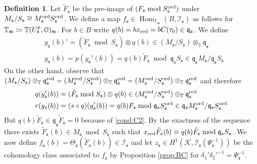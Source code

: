 \documentclass[leqno]{amsart}
\theoremstyle{definition}
\newtheorem{defn}[thm]{Definition}
\theoremstyle{remark}
\newcommand{\eo}{\EuScript{O}}
\DeclareMathOperator{\Hom}{Hom}
\newcommand{\fm}{\mathfrak{m}}
\newcommand{\fq}{\mathfrak{q}}
\newcommand{\fs}{\mathfrak{s}}
\newcommand{\red}{\textnormal{red}}
\newcommand{\xx}{x_\textnormal{red}}
\newcommand{\K}{{\mathcal{K}}} %
\newcommand{\TT}{\mathbb{T}} %
\newcommand{\I}{\mathcal{I}} %
\newcommand{\ord}{\textnormal{ord}} %
\begin{document}
\begin{defn}\label{def:cong_map}
Let $\tilde{F}_\fs$ be the pre-image of
$(F_\fs\bmod S_\fs^{\ord})$ under 
$M_\fs/S_\fs\cong M^{\ord}_{\fs}S^{\ord}_{\fs}$.
We define a map  $f_\fs\in \Hom_{\TT_\fm}(B,\I_\fs)$ 
as follows for $\TT_\fm\coloneqq \TT(U^p_\fs,\eo)_\fm$.
For $b\in B$ write $q(b)=b\xx=bC(\tau_0)\in\fq_\fs$.
We define
\begin{align*}
   &y_\fs(b)'=
(\tilde{F}_\fs\bmod S_\fs)\otimes q(b)\in 
(M_\fs/S_\fs)\otimes_\TT\fq_\fs\\
   &y_\fs(b)=p(y_\fs'(b))=
q(b)\tilde{F}_\fs\bmod \fq_\fs S_\fs\in 
\fq_\fs M_\fs/\fq_\fs S_\fs
\end{align*}
On the other hand, observe that 
$(M_\fs/S_\fs)\otimes_{\TT}\fq_\fs^\red=
(M_\fs^{\red}/S_\fs^{\red})\otimes_{\TT}\fq_\fs^\red=
(M_\fs^{\ord}/S_\fs^{\ord})\otimes_{\TT}\fq_\fs^\red$
and therefore
\begin{align*}
   q(y_\fs'(b))&=
(\tilde{F}_\fs\bmod S_\fs)\otimes q(b)\in 
(M^{\ord}_\fs/S^{\ord}_\fs)\otimes_\TT\fq_\fs^\red\\
   r(y_\fs(b))&=(s\circ q)(y_\fs'(b))=
q(b)F_\fs\bmod \fq_\fs S^{\ord}_\fs\in 
\fq_\fs M^{\ord}_\fs/\fq_\fs S^{\ord}_\fs
\end{align*}
But $q(b)\tilde{F}_\fs\in \fq_\fs \tilde{F}_\fs=0$ 
because of \ref{cond:C2}.
By the exactness of the sequence
there exists $\tilde{F}_\fs(b)\in M_\fs\bmod S_\fs$
such that 
$\xx \tilde{F}_\fs(b)\equiv q(b)\tilde{F}_\fs
\bmod \fq_\fs S_\fs$.
We now define 
$f_\fs(b)=\Theta_\fs(\tilde{F}_\fs(b))\in \I_\fs$
and let $z_\fs\in H^1(\K,\I_\fs(\Psi_\fs^{-1}))$
be the cohomology class
associated to $f_\fs$
by Proposition \ref{prop:BC}
for $\delta_1'\delta_2'^{-1}=\Psi_\fs^{-1}$.

\end{defn}
\end{document}
